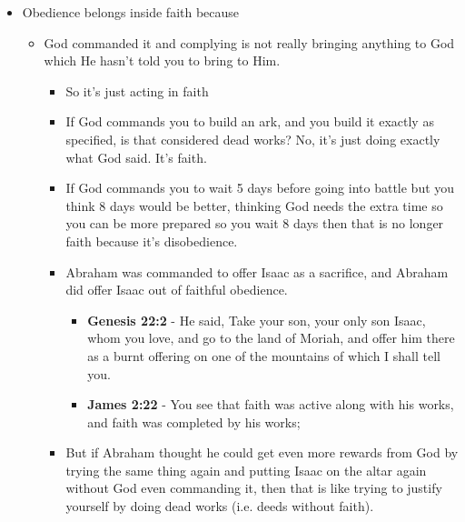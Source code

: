\documentclass[11pt]{article}
\begin{document}
\begin{itemize}
\item Obedience belongs inside faith because
\begin{itemize}
\item God commanded it and complying is not really bringing anything
to God which He hasn't told you to bring to Him.
\begin{itemize}
\item So it's just acting in faith
\item If God commands you to build an ark, and you build it exactly as specified, is that considered dead works? No, it's just doing exactly what God said. It's faith.
\item If God commands you to wait 5 days before going into battle but you think 8 days would be better, thinking God needs the extra time so you can be more prepared so you wait 8 days then that is no longer faith because it's disobedience.
\item Abraham was commanded to offer Isaac as a sacrifice, and Abraham did offer Isaac out of faithful obedience.
\begin{itemize}
\item \textbf{Genesis 22:2} - He said, Take your son, your only son Isaac, whom you love, and go to the land of Moriah, and offer him there as a burnt offering on one of the mountains of which I shall tell you.
\item \textbf{James 2:22} - You see that faith was active along with his works, and faith was completed by his works;
\end{itemize}
\item But if Abraham thought he could get even more rewards from God by trying the same thing again and putting Isaac on the altar again without God even commanding it, then that is like trying to justify yourself by doing dead works (i.e. deeds without faith).
\end{itemize}


\end{itemize}
\end{itemize}
\end{document}
